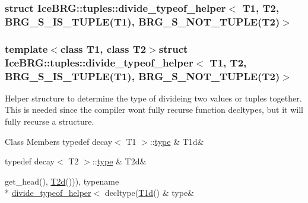 \subsubsection{struct Ice\+B\+R\+G\+:\+:tuples\+:\+:divide\+\_\+typeof\+\_\+helper$<$ T1, T2, B\+R\+G\+\_\+\+S\+\_\+\+I\+S\+\_\+\+T\+U\+P\+L\+E(T1), B\+R\+G\+\_\+\+S\+\_\+\+N\+O\+T\+\_\+\+T\+U\+P\+L\+E(T2)$>$}
\subsubsection*{template$<$class T1, class T2$>$struct Ice\+B\+R\+G\+::tuples\+::divide\+\_\+typeof\+\_\+helper$<$ T1, T2, B\+R\+G\+\_\+\+S\+\_\+\+I\+S\+\_\+\+T\+U\+P\+L\+E(\+T1), B\+R\+G\+\_\+\+S\+\_\+\+N\+O\+T\+\_\+\+T\+U\+P\+L\+E(\+T2)$>$}

Helper structure to determine the type of divideing two values or tuples together. This is needed since the compiler won\textquotesingle{}t fully recurse function decltypes, but it will fully recurse a structure. \begin{DoxyFields}{Class Members}
\hypertarget{namespaceIceBRG_1_1tuples_a8557420cff2527ee10fcebd5efec0dfa}{}typedef decay$<$ T1 $>$\+::\hyperlink{namespaceIceBRG_1_1tuples_a81675a05e5b378685be3983580f2c6a5}{type}\label{namespaceIceBRG_1_1tuples_a8557420cff2527ee10fcebd5efec0dfa}
&
T1d&
\\
\hline

\hypertarget{namespaceIceBRG_1_1tuples_a8a492fc9ba9dac5f8715af9f44c019e2}{}typedef decay$<$ T2 $>$\+::\hyperlink{namespaceIceBRG_1_1tuples_a81675a05e5b378685be3983580f2c6a5}{type}\label{namespaceIceBRG_1_1tuples_a8a492fc9ba9dac5f8715af9f44c019e2}
&
T2d&
\\
\hline

\hypertarget{namespaceIceBRG_1_1tuples_a81675a05e5b378685be3983580f2c6a5}{}get\+\_\+head(), \hyperlink{namespaceIceBRG_1_1tuples_a8a492fc9ba9dac5f8715af9f44c019e2}{T2d}())), typename \\*
\hyperlink{namespaceIceBRG_1_1tuples_structIceBRG_1_1tuples_1_1divide__typeof__helper}{divide\+\_\+typeof\+\_\+helper}$<$ decltype(\hyperlink{namespaceIceBRG_1_1tuples_a8557420cff2527ee10fcebd5efec0dfa}{T1d}()\label{namespaceIceBRG_1_1tuples_a81675a05e5b378685be3983580f2c6a5}
&
type&
\\
\hline

\end{DoxyFields}
\label{structIceBRG_1_1tuples_1_1divide__typeof__helper_3_01T1_00_01T2_00_01BRG__S__NOT__TUPLE_07T1_08_f2134547733f778a855586b5d8107f2b}
\hypertarget{namespaceIceBRG_1_1tuples_structIceBRG_1_1tuples_1_1divide__typeof__helper_3_01T1_00_01T2_00_01BRG__S__NOT__TUPLE_07T1_08_f2134547733f778a855586b5d8107f2b}{}
